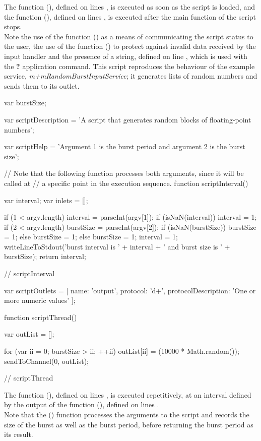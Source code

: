 The function (), defined on lines \longDash{},
is executed as soon as the script is loaded, and the function (),
defined on lines \longDash{}, is executed after the main function of
the script stops.\\

Note the use of the function () as a means of communicating the
script status to the user, the use of the function () to protect
against invalid data received by the input handler and the presence of a
 string, defined on line , which is used with the \textbf{?}
application command.
\secondaryEnd
\condPage
{}
This script reproduces the behaviour of the example service,
\emph{m+mRandomBurstInputService}; it generates lists of random numbers and sends them to
its outlet.
\codeBegin
\begin{listing}[5]{1}
var burstSize;

var scriptDescription = 'A script that generates random blocks of floating-point numbers';

var scriptHelp = 'Argument 1 is the burst period and argument 2 is the burst size';

// Note that the following function processes both arguments, since it will be called at
// a specific point in the execution sequence.
function scriptInterval()
{
    var interval;
    var inlets = [];
    
    if (1 < argv.length)
    {
        interval = parseInt(argv[1]);
        if (isNaN(interval))
        {
            interval = 1;
        }
        if (2 < argv.length)
        {
            burstSize = parseInt(argv[2]);
            if (isNaN(burstSize))
            {
                burstSize = 1;
            }
        }
        else
        {
            burstSize = 1;
        }
    }
    else
    {
        burstSize = 1;
        interval = 1;
    }
    writeLineToStdout('burst interval is ' + interval + ' and burst size is ' + burstSize);
    return interval;
} // scriptInterval

var scriptOutlets = [ { name: 'output', protocol: 'd+',
                        protocolDescription: 'One or more numeric values' } ];

function scriptThread()
{
    var outList = [];
    
    for (var ii = 0; burstSize > ii; ++ii)
    {
        outList[ii] = (10000 * Math.random());
    }
    sendToChannel(0, outList);
} // scriptThread
\end{listing}
\codeEnd{}
The function (), defined on lines \longDash{}, is
executed repetitively, at an interval defined by the output of the function
(), defined on lines \longDash{}.\\

Note that the () function processes the arguments to the script and
records the size of the burst as well as the burst period, before returning the burst
period as its result.
\secondaryEnd
\appendixEnd{}
